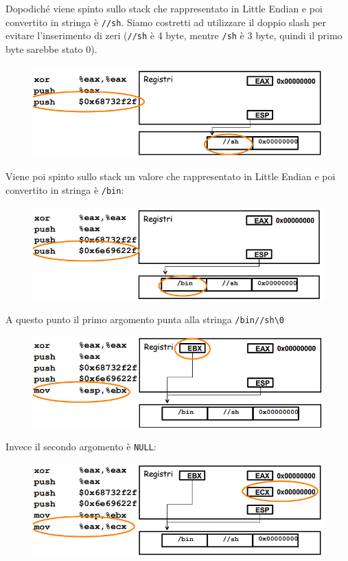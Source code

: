 Dopodiché viene spinto sullo stack che rappresentato in Little Endian e poi convertito in stringa è \texttt{//sh}. Siamo costretti ad utilizzare il doppio slash per evitare l'inserimento di zeri (\texttt{//sh} è 4 byte, mentre \texttt{/sh} è 3 byte, quindi il primo byte sarebbe stato 0).

\begin{figure}[hbpt!]
    \centering
    \includegraphics[width= 0.5 \textwidth]{./Images/cap8/8.3.png}
\end{figure}
\FloatBarrier

Viene poi spinto sullo stack un valore che rappresentato in Little Endian e poi convertito in stringa è \texttt{/bin}:

\begin{figure}[hbpt!]
    \centering
    \includegraphics[width= 0.5 \textwidth]{./Images/cap8/8.4.png}
\end{figure}
\FloatBarrier

A questo punto il primo argomento punta alla stringa \texttt{/bin//sh\textbackslash0}

\begin{figure}[hbpt!]
    \centering
    \includegraphics[width= 0.5 \textwidth]{./Images/cap8/8.5.png}
\end{figure}
\FloatBarrier

Invece il secondo argomento è \texttt{NULL}:

\begin{figure}[hbpt!]
    \centering
    \includegraphics[width= 0.5 \textwidth]{./Images/cap8/8.6.png}
\end{figure}
\FloatBarrier

